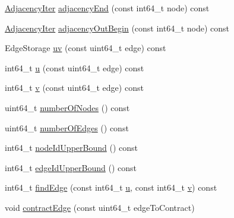 \begin{DoxyCompactItemize}
\item 
\hyperlink{classnifty_1_1graph_1_1EdgeContractionGraphWithSets_ab4782e97223ab8ba2d207325aae693d6}{Adjacency\+Iter} \hyperlink{classnifty_1_1graph_1_1EdgeContractionGraphWithSets_a80ba6846ff642ebdc31b93c9f8116abf}{adjacency\+End} (const int64\+\_\+t node) const 
\item 
\hyperlink{classnifty_1_1graph_1_1EdgeContractionGraphWithSets_ab4782e97223ab8ba2d207325aae693d6}{Adjacency\+Iter} \hyperlink{classnifty_1_1graph_1_1EdgeContractionGraphWithSets_a21ec4a0e7b2cb6f06761521066003a34}{adjacency\+Out\+Begin} (const int64\+\_\+t node) const 
\item 
Edge\+Storage \hyperlink{classnifty_1_1graph_1_1EdgeContractionGraphWithSets_a1a59be69bf3915f39c1492c62e098e09}{uv} (const uint64\+\_\+t edge) const 
\item 
int64\+\_\+t \hyperlink{classnifty_1_1graph_1_1EdgeContractionGraphWithSets_ab6a9c6b0b9bf368511c15b7a544b22a8}{u} (const uint64\+\_\+t edge) const 
\item 
int64\+\_\+t \hyperlink{classnifty_1_1graph_1_1EdgeContractionGraphWithSets_a98b71392054a18ce0dc9ae501f2b50fa}{v} (const uint64\+\_\+t edge) const 
\item 
uint64\+\_\+t \hyperlink{classnifty_1_1graph_1_1EdgeContractionGraphWithSets_ac7b95bcd4775eb6ebf43dd19c6db5eb0}{number\+Of\+Nodes} () const 
\item 
uint64\+\_\+t \hyperlink{classnifty_1_1graph_1_1EdgeContractionGraphWithSets_a1921bd2bbb2f6e9ba566410140997c11}{number\+Of\+Edges} () const 
\item 
int64\+\_\+t \hyperlink{classnifty_1_1graph_1_1EdgeContractionGraphWithSets_a5b7960306ee794f32b677881a1e0f692}{node\+Id\+Upper\+Bound} () const 
\item 
int64\+\_\+t \hyperlink{classnifty_1_1graph_1_1EdgeContractionGraphWithSets_a3468f49ec6597765d7e09729e2cf8353}{edge\+Id\+Upper\+Bound} () const 
\item 
int64\+\_\+t \hyperlink{classnifty_1_1graph_1_1EdgeContractionGraphWithSets_ac3944f85e26450f450cd2837a0e09eee}{find\+Edge} (const int64\+\_\+t \hyperlink{classnifty_1_1graph_1_1EdgeContractionGraphWithSets_ab6a9c6b0b9bf368511c15b7a544b22a8}{u}, const int64\+\_\+t \hyperlink{classnifty_1_1graph_1_1EdgeContractionGraphWithSets_a98b71392054a18ce0dc9ae501f2b50fa}{v}) const 
\item 
void \hyperlink{classnifty_1_1graph_1_1EdgeContractionGraphWithSets_aac2039e7aa273ca72a664636284e094c}{contract\+Edge} (const uint64\+\_\+t edge\+To\+Contract)
\item 

\end{DoxyCompactItemize}
